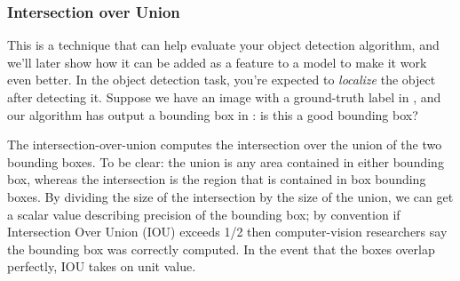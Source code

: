\documentclass[12pt]{article}
\begin{document}
\subsubsection{Intersection over Union} This is a technique that can help evaluate your object detection algorithm, and we'll later show how it can be added as a feature to a model to make it work even better. In the object detection task, you're expected to \emph{localize} the object after detecting it. Suppose we have an image with a ground-truth label in \color{purple}{purple}\color{black}, and our algorithm has output a bounding box in \color{orange}{orange}\color{black}: is this a good bounding box?

\begin{figure}[h]
  \centering
\end{figure}

The intersection-over-union computes the intersection over the union of the two bounding boxes. To be clear: the union is any area contained in either bounding box, whereas the intersection is the region that is contained in box bounding boxes. By dividing the size of the intersection by the size of the union, we can get a scalar value describing precision of the bounding box; by convention if Intersection Over Union (IOU) exceeds 1/2 then computer-vision researchers say the bounding box was correctly computed. In the event that the boxes overlap perfectly, IOU takes on unit value.
\end{document}
